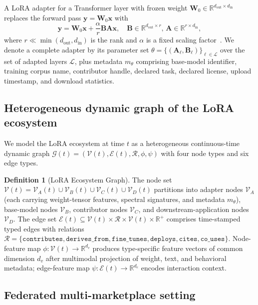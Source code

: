\documentclass[12pt,a4paper]{article}
\theoremstyle{definition}
\newtheorem{definition}{Definition}
\theoremstyle{remark}
\newcommand{\R}{\mathbb{R}}
\newcommand{\Vcal}{\mathcal{V}}
\newcommand{\Ecal}{\mathcal{E}}
\newcommand{\Rcal}{\mathcal{R}}
\newcommand{\Gcal}{\mathcal{G}}
\begin{document}
A LoRA adapter for a Transformer layer with frozen weight $\mathbf{W}_0 \in \R^{d_{\mathrm{out}} \times d_{\mathrm{in}}}$ replaces the forward pass $\mathbf{y} = \mathbf{W}_0 \mathbf{x}$ with
\begin{equation}
    \mathbf{y} = \mathbf{W}_0 \mathbf{x} + \frac{\alpha}{r} \mathbf{B}\mathbf{A}\mathbf{x},\quad \mathbf{B}\in\R^{d_{\mathrm{out}}\times r},\,\mathbf{A}\in\R^{r\times d_{\mathrm{in}}},
\label{eq:lora}
\end{equation}
where $r \ll \min(d_{\mathrm{out}}, d_{\mathrm{in}})$ is the rank and $\alpha$ is a fixed scaling factor~\cite{hu2021lora}. We denote a complete adapter by its parameter set $\theta = \{(\mathbf{A}_\ell, \mathbf{B}_\ell)\}_{\ell \in \mathcal{L}}$ over the set of adapted layers $\mathcal{L}$, plus metadata $m_\theta$ comprising base-model identifier, training corpus name, contributor handle, declared task, declared license, upload timestamp, and download statistics.

\subsection{Heterogeneous dynamic graph of the LoRA ecosystem}

We model the LoRA ecosystem at time $t$ as a heterogeneous continuous-time dynamic graph $\Gcal(t) = (\Vcal(t), \Ecal(t), \Rcal, \phi, \psi)$ with four node types and six edge types.

\begin{definition}[LoRA Ecosystem Graph]
\label{def:graph}
The node set $\Vcal(t) = \Vcal_A(t) \cup \Vcal_B(t) \cup \Vcal_C(t) \cup \Vcal_D(t)$ partitions into adapter nodes $\Vcal_A$ (each carrying weight-tensor features, spectral signatures, and metadata $m_\theta$), base-model nodes $\Vcal_B$, contributor nodes $\Vcal_C$, and downstream-application nodes $\Vcal_D$. The edge set $\Ecal(t) \subseteq \Vcal(t) \times \Rcal \times \Vcal(t) \times \R^+$ comprises time-stamped typed edges with relations $\Rcal = \{\texttt{contributes}, \texttt{derives\_from}, \texttt{fine\_tunes}, \texttt{deploys}, \texttt{cites}, \texttt{co\_uses}\}$. Node-feature map $\phi: \Vcal(t) \to \R^{d_v}$ produces type-specific feature vectors of common dimension $d_v$ after multimodal projection of weight, text, and behavioral metadata; edge-feature map $\psi: \Ecal(t) \to \R^{d_e}$ encodes interaction context.
\end{definition}

\subsection{Federated multi-marketplace setting}
\end{document}
